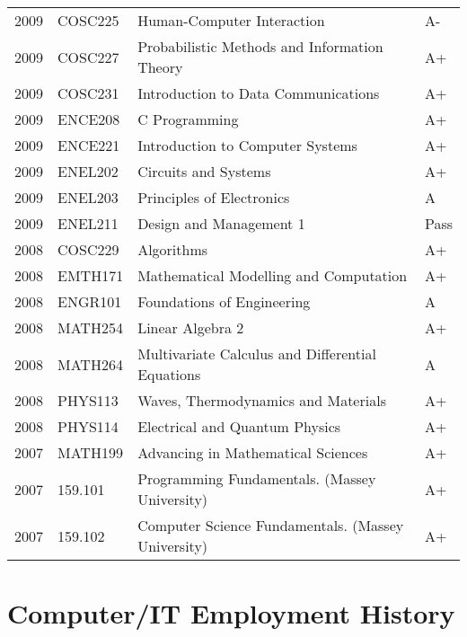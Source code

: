 \documentclass[10pt]{article}
\begin{document}
{\begin{tabularx}{\textwidth}{llXl}
                2009 & COSC225 & Human-Computer Interaction                         & A-   \\
                2009 & COSC227 & Probabilistic Methods and Information Theory       & A+   \\
                2009 & COSC231 & Introduction to Data Communications                & A+   \\
                2009 & ENCE208 & C Programming                                      & A+   \\
                2009 & ENCE221 & Introduction to Computer Systems                   & A+   \\
                2009 & ENEL202 & Circuits and Systems                               & A+   \\
                2009 & ENEL203 & Principles of Electronics                          & A    \\
                2009 & ENEL211 & Design and Management 1                            & Pass \\
                \hline
                2008 & COSC229 & Algorithms                                         & A+ \\
                2008 & EMTH171 & Mathematical Modelling and Computation             & A+ \\
                2008 & ENGR101 & Foundations of Engineering                         & A  \\
                2008 & MATH254 & Linear Algebra 2                                   & A+ \\
                2008 & MATH264 & Multivariate Calculus and Differential Equations   & A  \\
                2008 & PHYS113 & Waves, Thermodynamics and Materials                & A+ \\
                2008 & PHYS114 & Electrical and Quantum Physics                     & A+ \\
                \hline
                2007 & MATH199           & Advancing in Mathematical Sciences       & A+ \\
                2007 & 159.101           & Programming Fundamentals. (Massey University) & A+ \\
                2007 & 159.102           & Computer Science Fundamentals.  (Massey University) & A+ \\
                \hline
            \end{tabularx}
            }

    \section*{Computer/IT Employment History}
\end{document}
